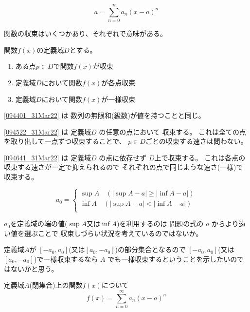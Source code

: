 \documentclass[12pt,b5paper]{ltjsarticle}
\begin{document}
 \begin{equation}
  a = \sum_{n=0}^{\infty} a_n (x-a)^n
 \end{equation}


\hrulefill

関数の収束はいくつかあり、それぞれで意味がある。

関数$f(x)$の定義域$D$とする。
\begin{enumerate}
 \item ある点$p\in D$で関数$f(x)$が収束
       \label{094401_31Mar22}
 \item 定義域$D$において関数$f(x)$が各点収束
       \label{094522_31Mar22}
 \item 定義域$D$において関数$f(x)$が一様収束
       \label{094641_31Mar22}
\end{enumerate}

\dotfill

\ref{094401_31Mar22} は 数列の無限和(級数)が値を持つことと同じ。

\ref{094522_31Mar22} は 定義域$D$ の任意の点において
収束する。
これは全ての点を取り出して一点ずつ収束することで、
$p\in D$ごとの収束する速さは問わない。

\ref{094641_31Mar22} は 定義域$D$ の点に依存せず
$D$上で収束する。
これは各点の収束する速さが一定で抑えられるので
それぞれの点で同じような速さ(一様)で収束する。

\hrulefill

 \begin{equation}
  a_0 =
   \begin{cases}
    \sup A \quad ( | \sup A -a | \geq | \inf A -a |)\\
    \inf A \quad ( | \sup A -a | < | \inf A -a |)\\
   \end{cases}
 \end{equation}

$a_0$を定義域の端の値($\sup A$又は$\inf A$)を利用するのは
問題の式の $a$ からより遠い値を選ぶことで
収束しづらい状況を考えているのではないか。

定義域$A$が $[-a_0, a_0]$(又は$[a_0, -a_0]$)の部分集合となるので
$[-a_0, a_0]$(又は$[a_0, -a_0]$)で一様収束するなら
 $A$ でも一様収束するということを示したいのではないかと思う。


\newpage

定義域$A$(閉集合)上の関数$f(x)$について
 \begin{equation}
  f(x) = \sum_{n=0}^{\infty} a_n (x-a)^n
 \end{equation}
\end{document}
